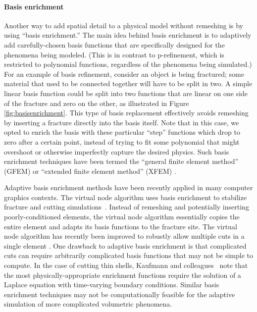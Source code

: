 \paragraph*{Basis enrichment}

Another way to add spatial detail to a physical model without remeshing is by using ``basis enrichment.'' The main idea behind basis enrichment is to adaptively add carefully-chosen basis functions that are specifically designed for the phenomena being modeled. (This is in contrast to p-refinement, which is restricted to polynomial functions, regardless of the phenomena being simulated.) For an example of basis refinement, consider an object is being fractured; some material that used to be connected together will have to be split in two. A simple linear basis function could be split into two functions that are linear on one side of the fracture and zero on the other, as illustrated in Figure \ref{fig:basisenrichment}. This type of basis replacement effectively avoids remeshing by inserting a fracture directly into the basis itself. Note that in this case, we opted to enrich the basis with these particular ``step'' functions which drop to zero after a certain point, instead of trying to fit some polynomial that might overshoot or otherwise imperfectly capture the desired physics. Such basis enrichment techniques have been termed the ``general finite element method'' (GFEM) or ``extended finite element method'' (XFEM) \cite{belytschko2009review}.

Adaptive basis enrichment methods have been recently applied in many computer graphics contexts.
The virtual node algorithm uses basis enrichment to stabilize fracture and cutting simulations~\cite{Molino2004,hegemann2013level}. Instead of remeshing and potentially inserting poorly-conditioned elements, the virtual node algorithm essentially copies the entire element and adapts its basis functions to the fracture site. The virtual node algorithm  has recently been improved to robustly allow multiple cuts in a single element \cite{Sifakis2007:Cutting,Wang2014}. One drawback to adaptive basis enrichment is that complicated cuts can require arbitrarily complicated basis functions that may not be simple to compute. In the case of cutting thin shells, Kaufmann and colleagues~\cite{Kaufmann2009} note that the most physically-appropriate enrichment functions require the solution of a Laplace equation with time-varying boundary conditions. Similar basis enrichment techniques may not be computationally feasible for the adaptive simulation of more complicated volumetric phenomena.

